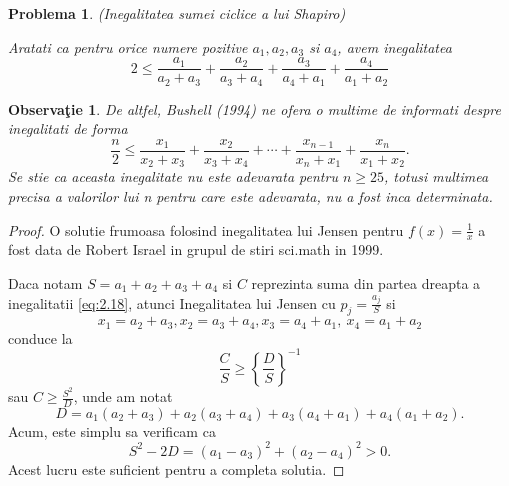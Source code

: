 \documentclass[a4paper,12pt,oneside]{report}
\newtheorem{problem}{Problema}
\newtheorem{remark}{Observa\c{t}ie}
\begin{document}
\begin{problem} (Inegalitatea sumei ciclice a lui Shapiro)

Aratati ca pentru orice numere pozitive
 \(a_{1} , a_{2} , a_{3}\)  si \(  a_{4}\), avem inegalitatea
 \begin{displaymath}
     2\leq \frac{a_{1}}{a_{2} + a_{3}} + \frac{a_{2}}{a_{3} + a_{4}} + \frac{a_{3}}{a_{4} + a_{1}} + \frac{a_{4}}{a_{1} + a_{2}} \label{eq:2.20} \tag{2.20}
 \end{displaymath}
 \end{problem}
 \begin{remark}
De altfel,  Bushell (1994) ne ofera o multime de informati despre inegalitati de forma
\begin{displaymath}
    \frac{n}{2} \leq \frac{x_{1}}{x_{2} + x_{3}} + \frac{x_{2}}{x_{3} + x_{4}} + \cdots+ \frac{x_{n - 1}}{x_{n} + x_{1}} + \frac{x_{n}}{x_{1} + x_{2}}.
\end{displaymath}
Se stie ca aceasta inegalitate nu este adevarata pentru  \(n\geq 25\), totusi multimea precisa a valorilor lui n pentru care este adevarata, nu a fost inca determinata.
\end{remark}
\begin{proof}
O solutie frumoasa folosind inegalitatea lui Jensen pentru \(f\left ( x \right ) = \frac{1}{x}\) a fost data de Robert Israel in grupul de stiri sci.math in 1999.

Daca notam \(S = a_{1} + a_{2} + a_{3} + a_{4}\) si \(C\) reprezinta suma din partea dreapta a inegalitatii \ref{eq:2.18}, atunci Inegalitatea lui Jensen cu \(p_{j} = \frac{a_{j}}{S}\) si
\[x_{1} = a_{2} + a_{3}, x_{2} = a_{3} + a_{4}, x_{3} = a_{4} + a_{1},~x_{4} = a_{1} + a_{2}\] conduce la
\[\frac{C}{S} \geq \left \{ \frac{D}{S} \right \}^{-1}\]
 sau \(C \geq \frac{S^{2}}{D}\), unde am notat
\begin{displaymath}
    D = a_{1}\left ( a_{2} + a_{3} \right ) + a_{2}\left ( a_{3} + a_{4} \right ) + a_{3}\left ( a_{4} + a_{1} \right ) + a_{4}\left ( a_{1} + a_{2} \right ).
\end{displaymath}
Acum, este simplu sa verificam ca
\begin{displaymath}
    S^{2} - 2D = \left ( a_{1} - a_{3} \right )^{2} + \left ( a_{2} - a_{4} \right )^{2}> 0.
\end{displaymath}
Acest lucru este suficient pentru a completa solutia.
\end{proof}
\end{document}
